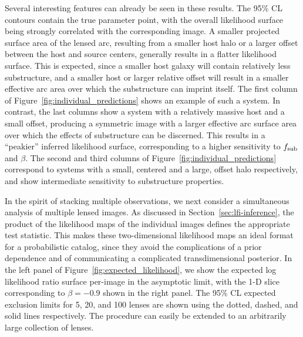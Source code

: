 \documentclass[twocolumn]{aastex63}
\begin{document}
Several interesting features can already be seen in these results. The 95\% CL contours contain the true parameter point, with the overall likelihood surface being strongly correlated with the corresponding image. A smaller projected surface area of the lensed arc, resulting from a smaller host halo or a larger offset between the host and source centers, generally results in a flatter likelihood surface. This is expected, since a smaller host galaxy will contain relatively less substructure, and a smaller host or larger relative offset will result in a smaller effective arc area over which the substructure can imprint itself. The first column of Figure~\ref{fig:individual_predictions} shows an example of such a system. In contrast, the last columns show a system with a relatively massive host and a small offset, producing a symmetric image with a larger effective arc surface area over which the effects of substructure can be discerned. This results in a ``peakier'' inferred likelihood surface, corresponding to a higher sensitivity to $f_{\mathrm{sub}}$ and $\beta$. The second and third columns of Figure~\ref{fig:individual_predictions} correspond to systems with a small, centered and a large, offset halo respectively, and show intermediate sensitivity to substructure properties.

In the spirit of stacking multiple observations, we next consider a simultaneous analysis of multiple lensed images. As discussed in Section~\ref{sec:lfi-inference}, the product of the likelihood maps of the individual images defines the appropriate test statistic. This makes these two-dimensional likelihood maps an ideal format for a probabilistic catalog, since they avoid the complications of a prior dependence and of communicating a complicated transdimensional posterior. In the left panel of Figure~\ref{fig:expected_likelihood}, we show the expected log likelihood ratio surface per-image in the asymptotic limit, with the 1-D slice corresponding to $\beta = -0.9$ shown in the right panel. The 95\% CL expected exclusion limits for 5, 20, and 100 lenses are shown using the dotted, dashed, and solid lines respectively. The procedure can easily be extended to an arbitrarily large collection of lenses.
\end{document}
